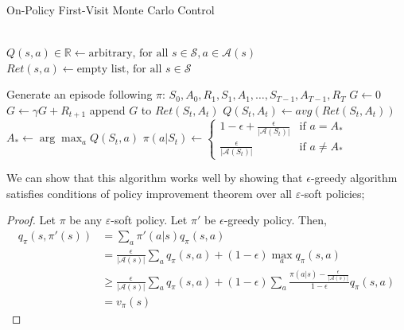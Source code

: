 \documentclass[../../main.tex]{subfiles}
\begin{document}
            {On-Policy First-Visit Monte Carlo Control}
            {\\
            }
            {\\
            }
            {
                $Q(s,a) \in \mathbb{R} \leftarrow \text{arbitrary, for all } s \in \mathcal{S}, a \in \mathcal{A}(s)$\;
                $Ret(s,a) \leftarrow \text{empty list, for all } s \in \mathcal{S}$\;

                {
                    Generate an episode following $\pi$: $S_0,A_0,R_1,S_1,A_1,\dots,S_{T-1},A_{T-1},R_T$\;
                    $G \leftarrow 0$\;
                    {
                        $G \leftarrow \gamma G + R_{t+1}$\;
                        {
                            append $G$ to $Ret(S_t,A_t)$\;
                            $Q(S_t,A_t) \leftarrow avg(Ret(S_t,A_t))$\;
                            $A_* \leftarrow \arg\max_a{Q(S_t,a)}$\;
                            $\pi(a|S_t) \leftarrow
                            \begin{cases}
                                1 - \epsilon + \frac{\epsilon}{|\mathcal{A}(S_t)|} &\text{if $a=A_*$}\\
                                \frac{\epsilon}{|\mathcal{A}(S_t)|} &\text{if $a\neq A_*$}
                            \end{cases}
                            $
                        }
                    }
                }
            }
            We can show that this algorithm works well by showing that $\epsilon$-greedy algorithm satisfies conditions of
            policy improvement theorem over all $\varepsilon$-soft policies;
            \begin{proof}
                Let $\pi$ be any $\varepsilon$-soft policy. Let $\pi'$ be $\epsilon$-greedy policy. Then,
                \begin{align}
                    q_\pi(s,\pi'(s))
                    &=\sum_a \pi'(a|s)q_\pi(s,a) \\
                    &=\frac{\epsilon}{|\mathcal{A}(s)|}\sum_a q_\pi(s,a) + (1-\epsilon)\max_a{q_\pi(s,a)} \\
                    &\geq \frac{\epsilon}{|\mathcal{A}(s)|}\sum_a q_\pi(s,a) + (1-\epsilon)\sum_a \frac{\pi(a|s)-\frac{\epsilon}{|\mathcal{A}(s)|}}{1-\epsilon}q_\pi(s,a) \label{weightedAvg} \\
                    &=v_\pi(s)
                \end{align}
            \end{proof}
\end{document}
